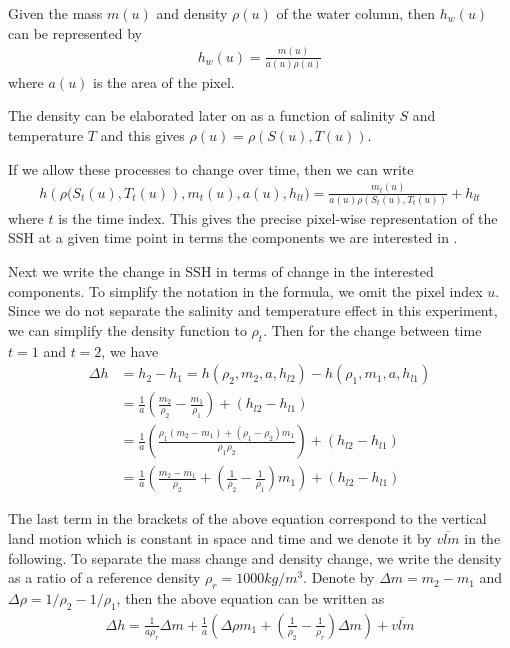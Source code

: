 \documentclass[a4paper,12pt]{article}
\begin{document}
Given the mass $m(u)$ and density $\rho(u)$ of the water column, then $h_w(u)$ can be represented by 
\begin{align}
h_w(u) = \frac{m(u)}{a(u) \rho(u)}
\end{align} 
where $a(u)$ is the area of the pixel.

The density can be elaborated later on as a function of salinity $S$ and temperature $T$ and this gives $\rho(u) = \rho(S(u), T(u))$.

If we allow these processes to change over time, then we can write
\begin{align}
h\left(\rho(S_t(u), T_t(u)\right), m_t(u), a(u), h_{lt}) = \frac{m_t(u)}{a(u) \rho(S_t(u), T_t(u))} + h_{lt}
\end{align}
where $t$ is the time index. This gives the precise pixel-wise representation of the SSH at a given time point in terms the components we are interested in .

Next we write the change in SSH in terms of change in the interested components. To simplify the notation in the formula, we omit the pixel index $u$. Since we do not separate the salinity and temperature effect in this experiment, we can simplify the density function to $\rho_t$. Then for the change between time $t = 1$ and $t=2$, we have
\begin{align}
\Delta h & = h_2 - h_1 = h(\rho_2, m_2, a, h_{l2}) - h(\rho_1, m_1, a, h_{l1}) \\
         & = \frac{1}{a} \left( \frac{m_2}{\rho_2} - \frac{m_1}{\rho_1}\right) + (h_{l2} - h_{l1}) \\
         & =  \frac{1}{a} \left(\frac{\rho_1 (m_2 - m_1) + (\rho_1 - \rho_2) m_1}{\rho_1\rho_2} \right) + (h_{l2} - h_{l1})\\
         & = \frac{1}{a} \left(\frac{m_2 - m_1}{\rho_2}  + \left(\frac{1}{\rho_2}- \frac{1}{\rho_1} \right) m_1 \right) + (h_{l2} - h_{l1})
\end{align}

The last term in the brackets of the above equation correspond to the vertical land motion which is constant in space and time and we denote it by $\overline{vlm}$ in the following. To separate the mass change and density change, we write the density as a ratio of a reference density $\rho_r = 1000kg/m^3$. Denote by $\Delta m = m_2 - m_1$ and $\Delta \rho = 1/\rho_2 - 1/\rho_1$, then the above equation can be written as
\begin{align} \label{eq:linear1}
\Delta h = \frac{1}{a \rho_r} \Delta m  + \frac{1}{a}\left(\Delta \rho m_1 + \left(\frac{1}{\rho_2} - \frac{1}{\rho_r}\right)\Delta m \right) + \overline{vlm}
\end{align}
\end{document}
